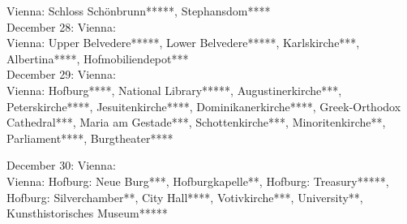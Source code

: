 Vienna: Schloss Sch\"onbrunn*****, Stephansdom****\\

December 28: Vienna: \\
Vienna: Upper Belvedere*****, Lower Belvedere*****, Karlskirche***, Albertina****, Hofmobiliendepot***\\

December 29: Vienna:\\
Vienna: Hofburg****, National Library*****, Augustinerkirche***, Peterskirche****, Jesuitenkirche****, Dominikanerkirche****, Greek-Orthodox Cathedral***, Maria am Gestade***, Schottenkirche***, Minoritenkirche**, Parliament****, Burgtheater****

December 30: Vienna:\\
Vienna: Hofburg: Neue Burg***, Hofburgkapelle**, Hofburg: Treasury*****, Hofburg: Silverchamber**, City Hall****, Votivkirche***, University**, Kunsthistorisches Museum*****
